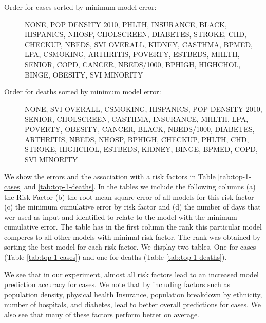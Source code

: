 \documentclass[a4paper, inpress]{jds} %
\renewcommand{\_}{%
    \textunderscore\hspace{0pt}%
}
\begin{document}
\begin{description}

\item[Order for cases sorted by minimum model error:] NONE,
  POP\_DENSITY\_2010, PHLTH, INSURANCE, BLACK,
  HISPANICS, NHOSP, CHOLSCREEN, DIABETES, STROKE,
  CHD, CHECKUP, NBEDS, SVI\_OVERALL, KIDNEY, CASTHMA, BPMED,
  LPA, CSMOKING, ARTHRITIS, POVERTY, ESTBEDS, MHLTH, SENIOR, COPD,
  CANCER, NBEDS/1000, BPHIGH, HIGHCHOL, BINGE, OBESITY, SVI\_MINORITY

\item[Order for deaths sorted by minimum model error:] NONE,
  SVI\_OVERALL, CSMOKING, HISPANICS, POP\_DENSITY\_2010,
  SENIOR, CHOLSCREEN, CASTHMA, INSURANCE, MHLTH, LPA,
  POVERTY, OBESITY, CANCER, BLACK, NBEDS/1000, DIABETES, ARTHRITIS,
  NBEDS, NHOSP, BPHIGH, CHECKUP, PHLTH, CHD, STROKE, HIGHCHOL,
  ESTBEDS, KIDNEY, BINGE, BPMED, COPD, SVI\_MINORITY
\end{description}

We show the errors and the association with a risk factors in Table
 \ref{tab:top-1-cases} and \ref{tab:top-1-deaths}. In the tables we include the following columns (a) the Risk Factor (b) the root mean square error of all models for this risk factor (c) the minimum cumulative error by risk factor and (d) the number of days that wer used as input and identified to relate to the model with the minimum cumulative error. The table has in the first column the rank this particular model comperes to all other models with minimal risk factor. 
The rank was obtained by sorting the best model for each risk factor. 
We display two tables. One for cases (Table \ref{tab:top-1-cases}) and one for deaths (Table \ref{tab:top-1-deaths}).

We see that in our experiment, almost all risk factors lead to an increased
model prediction accuracy for cases.  We note that by including
factors such as population density, physical health Insurance,
population breakdown by ethnicity, number of hospitals, and diabetes,
lead to better overall predictions for cases. 
We also see that
many of these factors perform better on average.
\end{document}
